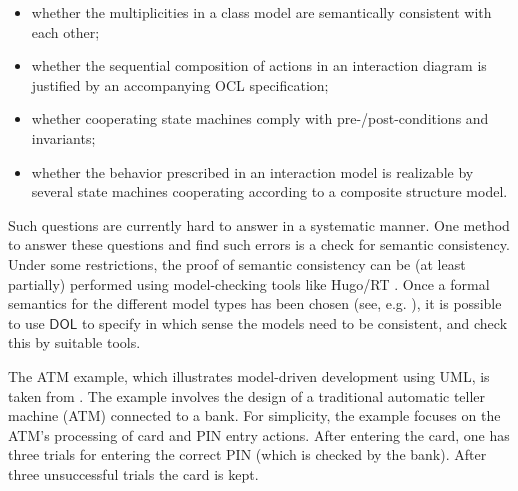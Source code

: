 \documentclass[10pt, a4paper]{isov2}
\newcommand*{\DOL}{\ensuremath{\mathsf{DOL}}\xspace}
\begin{document}
 \begin{itemize} 
\item whether the multiplicities in a class model are semantically consistent with each other;
\item	  whether the sequential composition of actions in an interaction diagram is justified by an accompanying OCL specification;
\item 	whether cooperating state machines comply with pre-/post-conditions and invariants;
\item 	whether the behavior prescribed in an interaction model is realizable by several state machines cooperating according to a composite structure model.
 \end{itemize} 
Such questions are currently hard to answer in a systematic manner. One method to answer these questions and find such errors is a check for semantic 
consistency. Under some restrictions, the proof of semantic consistency can be (at least partially) performed using model-checking tools like Hugo/RT \cite{knapp-wuttke:models06wsh:2007}. 
Once a formal semantics for the different model types has been chosen (see, e.g. \cite{knapp-mossakowski-roggenbach:corr:2014}), it is possible to use \DOL to specify in which 
sense the models need to be consistent, and check this by suitable tools.


\label{sec:atm-example}

 The ATM example, which illustrates model-driven development using UML,
is taken from \cite{knapp-mossakowski-roggenbach:corr:2014}.  The example involves
the design of a traditional automatic teller machine (ATM) connected
to a bank. For simplicity,  the example focuses
 on the ATM's processing of card and PIN entry actions.  
After entering the card, one has three
trials for entering the correct PIN (which is checked by the
bank). After three unsuccessful trials the card is kept.
\end{document}
